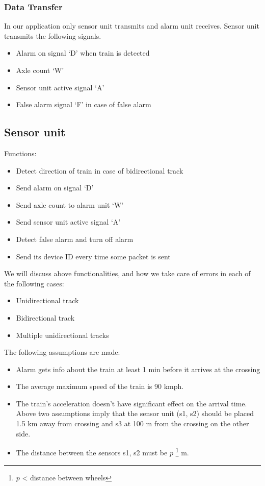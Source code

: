 \documentclass[aps,letterpaper,11pt]{article}
\begin{document}
\subsubsection{Data Transfer}
In our application only sensor unit transmits and alarm unit receives. Sensor
unit transmits the
following signals.
\begin{itemize}
\item Alarm on signal `D' when train is detected
\item Axle count `W'
\item Sensor unit active signal `A'
\item False alarm signal `F' in case of false alarm
\end{itemize}
\subsection{Sensor unit}
Functions:
\begin{itemize}
  \item Detect direction of train in case of bidirectional track
  \item Send alarm on signal `D'
  \item Send axle count to alarm unit `W'
  \item Send sensor unit active signal `A'
  \item Detect false alarm and turn off alarm
  \item Send its device ID every time some packet is sent
\end{itemize}

We will discuss above functionalities, and how we take care of errors in
each of the following cases:
\begin{itemize}
  \item Unidirectional track
  \item Bidirectional track
  \item Multiple unidirectional tracks
\end{itemize}

The following assumptions are made:
\begin{itemize}
  \item Alarm gets info about the train at least 1 min before it arrives at the crossing
  \item The average maximum speed of the train is 90 kmph.
  \item The train's acceleration doesn't have significant effect on the arrival time.
   Above two assumptions imply that the sensor unit (s1, s2) should be placed 1.5 km away from crossing and s3 at 100 m from the crossing on the other side.
  \item The distance between the sensors s1, s2 must be $p$ \footnote{$p$ < distance between wheels} m.
\end{itemize}
\end{document}
